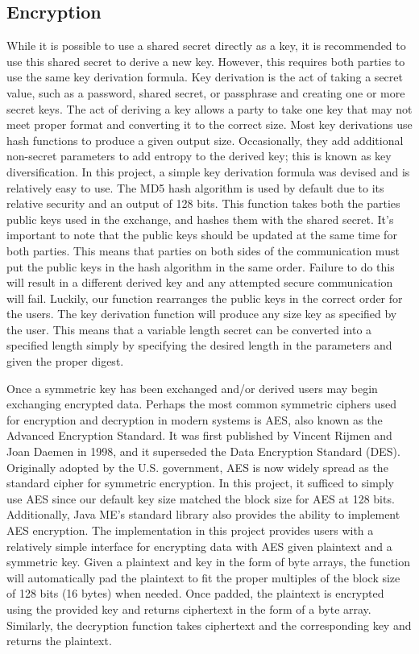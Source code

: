 \subsection{Encryption}

While it is possible to use a shared secret directly as a key, it is recommended to use this shared secret to derive a new key. However, this requires both parties to use the same key derivation formula. Key derivation is the act of taking a secret value, such as a password, shared secret, or passphrase and creating one or more secret keys. The act of deriving a key allows a party to take one key that may not meet proper format and converting it to the correct size. Most key derivations use hash functions to produce a given output size. Occasionally, they add additional non-secret parameters to add entropy to the derived key; this is known as key diversification. In this project, a simple key derivation formula was devised and is relatively easy to use. The MD5 hash algorithm is used by default due to its relative security and an output of 128 bits. This function takes both the parties public keys used in the exchange, and hashes them with the shared secret. It's important to note that the public keys should be updated at the same time for both parties. This means that parties on both sides of the communication must put the public keys in the hash algorithm in the same order. Failure to do this will result in a different derived key and any attempted secure communication will fail. Luckily, our function rearranges the public keys in the correct order for the users. The key derivation function will produce any size key as specified by the user. This means that a variable length secret can be converted into a specified length simply by specifying the desired length in the parameters and given the proper digest. 

Once a symmetric key has been exchanged and/or derived users may begin exchanging encrypted data. Perhaps the most common symmetric ciphers used for encryption and decryption in modern systems is AES, also known as the Advanced Encryption Standard. It was first published by Vincent Rijmen and Joan Daemen in 1998, and it superseded the Data Encryption Standard (DES).  Originally adopted by the U.S. government, AES is now widely spread as the standard cipher for symmetric encryption. In this project, it sufficed to simply use AES since our default key size matched the block size for AES at 128 bits. Additionally, Java ME's standard library also provides the ability to implement AES encryption. The implementation in this project provides users with a relatively simple interface for encrypting data with AES given plaintext and a symmetric key. Given a plaintext and key in the form of byte arrays, the function will automatically pad the plaintext to fit the proper multiples of the block size of 128 bits (16 bytes) when needed. Once padded, the plaintext is encrypted using the provided key and returns ciphertext in the form of a byte array. Similarly, the decryption function  takes ciphertext and the corresponding key and returns the plaintext. 

